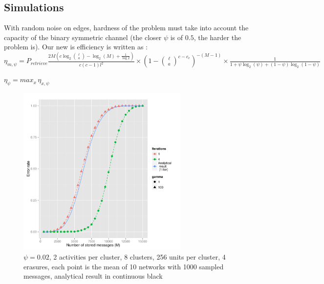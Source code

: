 \documentclass[english,10pt,twocolumn]{IEEEtran}
\theoremstyle{definition}
\begin{document}
	\subsection{Simulations}
	
	With random noise on edges, hardness of the problem must take into account the capacity of the binary symmetric channel (the closer $\psi$ is of $0.5$, the harder the problem is). Our new is efficiency is written as :  	
	$\eta_{m, \psi} = P_{retrieve}  \frac{2 M \left(c \log_2{\ell \choose a } - \log_2(M) + \frac{1}{\log 2} \right)}{c(c-1)l^2} \times (1-{\ell \choose a}^{c - c_e})^{-(M-1)} \times \frac{1}{1 + \psi \log_2(\psi) +(1-\psi) \log_2(1-\psi)} $
	
	$\eta_\psi = max_x \, \eta_{x, \psi}$
	\begin{figure}[!htb]
		\includegraphics[width=8.5cm]{Courbes/figpsic8l256e4psi2percent}%
		\caption{$\psi = 0.02$, 2 activities per cluster, 8 clusters, 256 units per cluster, 4 erasures, each point is the mean of 10 networks with 1000 sampled messages, analytical result in continuous black}
		\label{psith}
	\end{figure}
	
\end{document}

